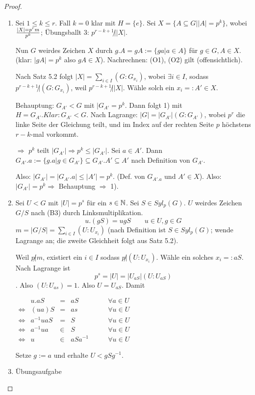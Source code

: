 \documentclass[12pt,a4paper]{scrartcl}
\begin{document}
\begin{proof}
	\leavevmode
	\begin{enumerate}
		\item Sei $1\leq k \leq r$. Fall $k = 0$ klar mit $H = \{e\}$. Sei $X = \{A\subseteq G| |A| = p^k\}$, wobei $|X| = {p^rm}\over{p^k}$; Übungsballt 3: $p^{r-k+1}\not | |X|$.
		
		Nun $G$ weirdes Zeichen $X$ durch $g.A = gA:=\{ga|a\in A\}$ für $g\in G, A\in X$. (klar: $|gA| = p^k $ also $gA\in X$). Nachrechnen: (O1), (O2) gilt (offensichtlich). 
		
		Nach Satz 5.2 folgt $|X| = \sum_{i\in I}(G:G_{x_i})$, wobei $\exists i\in I$, sodass $p^{r-k+1}\not| (G:G_{x_i})$, weil $p^{r-k+1}\not||X|$. Wähle solch ein $x_i = : A'\in X$.
		
		Behauptung: $G_{A'}<G$ mit $|G_{A'} = p^k$. Dann folgt 1) mit $H = G_{A'}. Klar: G_{A'}<G$. Nach Lagrange: $|G| = |G_{A'}|(G:G_{A'})$, wobei $p^r$ die linke Seite der Gleichung teilt, und im Index auf der rechten Seite $p$ höchstens $r-k$-mal vorkommt.
		
		$\Rightarrow$ $p^k$ teilt $|G_{A'}|\Rightarrow p^k\leq |G_{A'}|$. Sei $a\in A'$. Dann $G_{A'}.a:= \{g.a|g\in G_{A'}\}\subseteq G_{A'}.A'\subseteq A'$ nach Definition von $G_{A'}$.
		
		Also: $|G_{A'}| = |G_{A'}.a|\leq |A'| = p^k$.  (Def. von $G_{A'.a}$ und $A'\in X$).
		Also: $|G_{A'}| = p^k\Rightarrow$ Behauptung $\Rightarrow$ 1).
		
		\item Sei $U<G$ mit $|U| = p^s$ für ein $s\in\mathbb N$. Sei $S\in Syl_p(G)$. $U$ weirdes Zeichen $G/S$ nach (B3) durch Linksmultiplikation.
		$$ u.(gS) = ugS\qquad u\in U, g\in G$$
		$m = |G/S| = \sum_{i\in I}(U:U_{x_i})$ (nach Definition ist $S\in Syl_p(G)$; wende Lagrange an; die zweite Gleichheit folgt aus Satz 5.2).
		
		Weil $p\not| m$, existiert ein $i\in I$ sodass $p\not|(U:U_{x_i})$. Wähle ein solches $x_i =: aS$. Nach Lagrange ist
		$$ p^s = |U| = |U_{aS}|(U:U_{aS})$$. Also $(U:U_{as}) = 1$. Also $U = U_{aS}$. Damit
		\begin{center}
			$ \begin{array}{crclc}
			&u.aS &=& aS      						\qquad& \forall a\in U\\
			\Leftrightarrow& (ua)S &=& as		\qquad &\forall u\in U\\
			\Leftrightarrow& a^{-1}uaS &=& S \qquad &\forall u\in U\\
			\Leftrightarrow& a^{-1}ua&\in& S  \qquad &\forall u\in U\\
			\Leftrightarrow& u&\in& aSa^{-1}  \qquad &\forall u\in U
			\end{array}$
		\end{center}
		Setze $g := a$ und erhalte $U<gSg^{-1}$.
		
		\item Übungsaufgabe
	\end{enumerate}
\end{proof}
\end{document}
